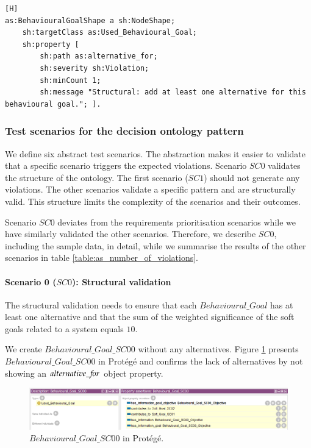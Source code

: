 \begin{lstlisting}[float,language=SHACL,caption={The SHACL shapes that generate a violation if an individual that is classified as $Behavioural\_Goal$ violates this constraint.},label={SHACL_AS_STRUC_BG}][H]
as:BehaviouralGoalShape a sh:NodeShape;
	sh:targetClass as:Used_Behavioural_Goal; 
	sh:property [
		sh:path as:alternative_for;
		sh:severity sh:Violation; 
		sh:minCount 1; 
		sh:message "Structural: add at least one alternative for this behavioural goal."; ].
\end{lstlisting}

\subsubsection{Test scenarios for the decision ontology pattern}
We define six abstract test scenarios. The abstraction makes it easier to validate that a specific scenario triggers the expected violations. Scenario $SC0$ validates the structure of the ontology. The first scenario ($SC1$) should not generate any violations. The other scenarios validate a specific pattern and are structurally valid. This structure limits the complexity of the scenarios and their outcomes. 

Scenario $SC0$ deviates from the requirements prioritisation scenarios while we have similarly validated the other scenarios. Therefore, we describe $SC0$, including the sample data, in detail, while we summarise the results of the other scenarios in table \ref{table:as_number_of_violations}.

\paragraph{Scenario 0 ($SC0$): Structural validation}
The structural validation needs to ensure that each $Behavioural\_Goal$ has at least one alternative and that the sum of the weighted significance of the soft goals related to a system equals $10$. 

We create $Behavioural\_Goal\_SC00$ without any alternatives. Figure \ref{fig:05_AS_SC0_Behavioural_Goal_SC00} presents $Behavioural\_Goal\_SC00$ in Prot\'eg\'e and confirms the lack of alternatives by not showing an $alternative\_{\mkern-2mu f\mkern-3mu}or$ object property.

\begin{figure}[H]
\centering
  \includegraphics[width=13cm]{../../Images/05_Validation/05_AS_SC5_Behavioural_Goal_SC00.png}
  \caption{$Behavioural\_Goal\_SC00$ in Prot\'eg\'e.}
  \label{fig:05_AS_SC0_Behavioural_Goal_SC00}
\end{figure}

